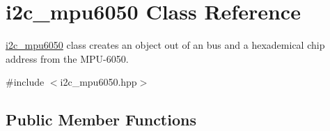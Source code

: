 \hypertarget{classi2c__mpu6050}{}\section{i2c\+\_\+mpu6050 Class Reference}
\label{classi2c__mpu6050}


\mbox{\hyperlink{classi2c__mpu6050}{i2c\+\_\+mpu6050}} class creates an object out of an bus and a hexademical chip address from the M\+P\+U-\/6050.  




{\ttfamily \#include $<$i2c\+\_\+mpu6050.\+hpp$>$}

\subsection*{Public Member Functions}
